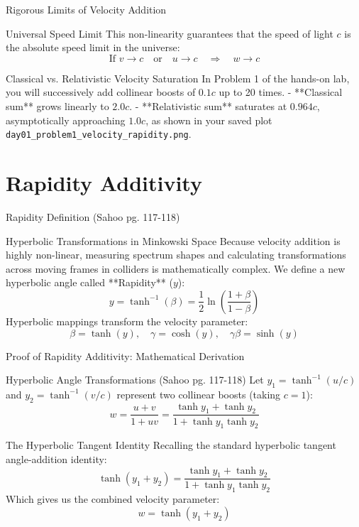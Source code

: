 \documentclass[aspectratio=169]{beamer}
\begin{document}
\begin{frame}{Rigorous Limits of Velocity Addition}
    \begin{block}{Universal Speed Limit}
        This non-linearity guarantees that the speed of light $c$ is the absolute speed limit in the universe:
        \[ \text{If } v \rightarrow c \quad \text{or} \quad u \rightarrow c \quad \Rightarrow \quad w \rightarrow c \]
    \end{block}
    \begin{block}{Classical vs. Relativistic Velocity Saturation}
        In Problem 1 of the hands-on lab, you will successively add collinear boosts of $0.1c$ up to 20 times. 
        - **Classical sum** grows linearly to $2.0c$.
        - **Relativistic sum** saturates at $0.964c$, asymptotically approaching $1.0c$, as shown in your saved plot \texttt{day01\_problem1\_velocity\_rapidity.png}.
    \end{block}
\end{frame}

\section{Rapidity Additivity}

\begin{frame}{Rapidity Definition (Sahoo pg. 117-118)}
    \begin{block}{Hyperbolic Transformations in Minkowski Space}
        Because velocity addition is highly non-linear, measuring spectrum shapes and calculating transformations across moving frames in colliders is mathematically complex. We define a new hyperbolic angle called **Rapidity** ($y$):
        \[ y = \tanh^{-1}(\beta) = \frac{1}{2} \ln \left( \frac{1+\beta}{1-\beta} \right) \]
        Hyperbolic mappings transform the velocity parameter:
        \[ \beta = \tanh(y), \quad \gamma = \cosh(y), \quad \gamma\beta = \sinh(y) \]
    \end{block}
\end{frame}

\begin{frame}{Proof of Rapidity Additivity: Mathematical Derivation}
    \begin{block}{Hyperbolic Angle Transformations (Sahoo pg. 117-118)}
        Let $y_1 = \tanh^{-1}(u/c)$ and $y_2 = \tanh^{-1}(v/c)$ represent two collinear boosts (taking $c=1$):
        \[ w = \frac{u+v}{1 + uv} = \frac{\tanh y_1 + \tanh y_2}{1 + \tanh y_1 \tanh y_2} \]
    \end{block}
    \begin{block}{The Hyperbolic Tangent Identity}
        Recalling the standard hyperbolic tangent angle-addition identity:
        \[ \tanh(y_1 + y_2) = \frac{\tanh y_1 + \tanh y_2}{1 + \tanh y_1 \tanh y_2} \]
        Which gives us the combined velocity parameter:
        \[ w = \tanh(y_1 + y_2) \]
    \end{block}
\end{frame}
\end{document}
